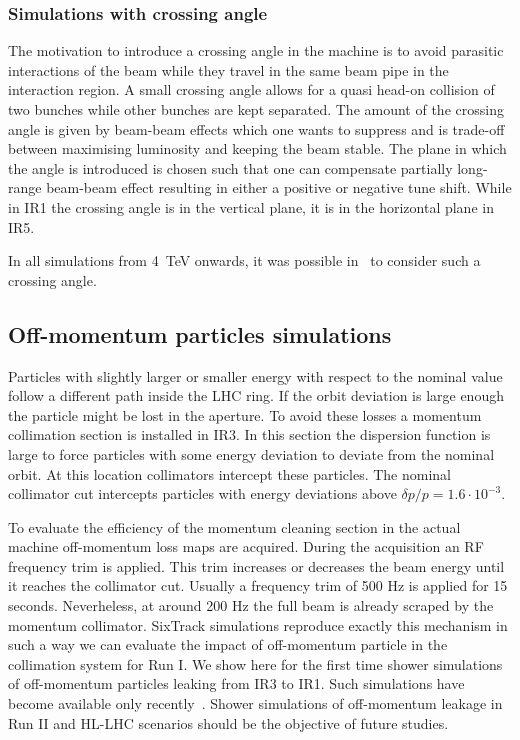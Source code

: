 \subsubsection{Simulations with crossing angle}
The motivation to introduce a crossing angle in the machine is to avoid parasitic interactions of the beam while they travel in the same beam pipe in the interaction region. A small crossing angle allows for a quasi head-on collision of two bunches while other bunches are kept separated. The amount of the crossing angle is given by beam-beam effects which one wants to suppress and is trade-off between maximising luminosity and keeping the beam stable. The plane in which the angle is introduced is chosen such that one can compensate partially long-range beam-beam effect resulting in either a positive or negative tune shift. While in IR1 the crossing angle is in the vertical plane, it is in the horizontal plane in IR5.

In all simulations from 4~TeV onwards, it was possible in \fluka~to consider such a crossing angle.

\subsection{Off-momentum particles simulations}
Particles with slightly larger or smaller energy with respect to the nominal value follow a different path inside the LHC ring. If the orbit deviation is large enough the particle might be lost in the aperture. To avoid these losses a momentum collimation section is installed in IR3. In this section the dispersion function is large to force particles with some energy deviation to deviate from the nominal orbit. At this location collimators intercept these particles. The nominal collimator cut intercepts particles with energy deviations above $\delta p/p = 1.6\cdot 10^{-3}$.

To evaluate the efficiency of the momentum cleaning section in the actual machine off-momentum loss maps are acquired. During the acquisition an RF frequency trim is applied. This trim increases or decreases the beam energy until it reaches the collimator cut. Usually a frequency trim of 500 Hz is applied for 15 seconds. Neverheless, at around 200 Hz the full beam is already scraped by the momentum collimator. SixTrack simulations reproduce exactly this mechanism in such a way we can evaluate the impact of off-momentum particle in the collimation system for Run I.
We show here for the first time shower simulations of off-momentum particles leaking from IR3 to IR1. Such simulations have become available only recently~\cite{HectorsPaper}. Shower simulations of off-momentum leakage in Run II and HL-LHC scenarios should be the objective of future studies.

